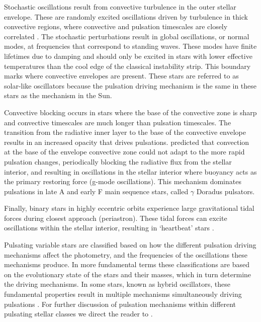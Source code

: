Stochastic oscillations result from convective turbulence in the outer stellar envelope. These are randomly excited oscillations driven by turbulence in thick convective regions, where convective and pulsation timescales are closely correlated \citep{handler_asteroseismology_2013}. The stochastic perturbations result in global oscillations, or normal modes, at frequencies that correspond to standing waves. These modes have finite lifetimes due to damping and should only be excited in stars with lower effective temperatures than the cool edge of the classical instability strip. This boundary marks where convective envelopes are present. These stars are referred to as solar-like oscillators because the pulsation driving mechanism is the same in these stars as the mechanism in the Sun.

Convective blocking occurs in stars where the base of the convective zone is sharp and convective timescales are much longer than pulsation timescales. The transition from the radiative inner layer to the base of the convective envelope results in an increased opacity that drives pulsations. \cite{guzik_driving_2000} predicted that convection at the base of the envelope convective zone could not adapt to the more rapid pulsation changes, periodically blocking the radiative flux from the stellar interior, and resulting in oscillations in the stellar interior where buoyancy acts as the primary restoring force (g-mode oscillations). This mechanism dominates pulsations in late A and early F main sequence stars, called $\gamma$ Doradus pulsators.

Finally, binary stars in highly eccentric orbits experience large gravitational tidal forces during closest approach (periastron). These tidal forces can excite oscillations within the stellar interior, resulting in `heartbeat' stars \citep{thompson_class_2012}.

Pulsating variable stars are classified based on how the different pulsation driving mechanisms affect the photometry, and the frequencies of the oscillations these mechanisms produce. In more fundamental terms these classifications are based on the evolutionary state of the stars and their masses, which in turn determine the driving mechanisms. In some stars, known as hybrid oscillators, these fundamental properties result in multiple mechanisms simultaneously driving pulsations \cite[e.g.][]{antoci_excitation_2011}.  For further discussion of pulsation mechanisms within different pulsating stellar classes we direct the reader to \cite{aerts_asteroseismology_2010}.

